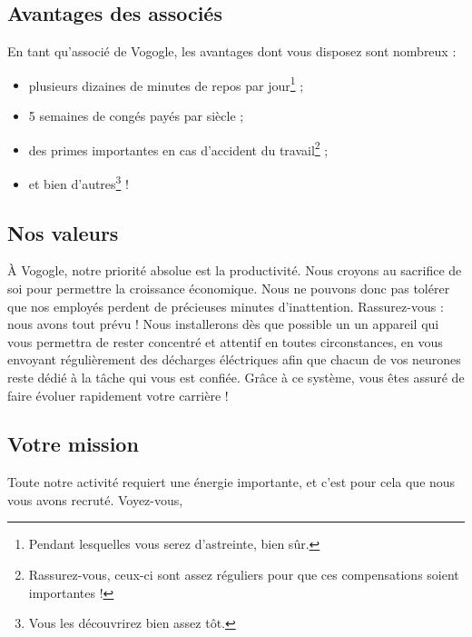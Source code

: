 \subsection{Avantages des associés}

En tant qu'associé de Vogogle, les avantages dont vous disposez sont nombreux :

\begin{itemize}
    \item plusieurs dizaines de minutes de repos par jour\footnote{Pendant
        lesquelles vous serez d'astreinte, bien sûr.} ;
    \item 5 semaines de congés payés par siècle ;
    \item des primes importantes en cas d'accident du
        travail\footnote{Rassurez-vous, ceux-ci sont assez réguliers pour
        que ces compensations soient importantes !} ;
    \item et bien d'autres\footnote{Vous les découvrirez bien assez tôt.} !
\end{itemize}

\subsection{Nos valeurs}

À Vogogle, notre priorité absolue est la productivité. Nous croyons au
sacrifice de soi pour permettre la croissance économique. Nous ne pouvons donc
pas tolérer que nos employés perdent de précieuses minutes d'inattention.
Rassurez-vous : nous avons tout prévu ! Nous installerons dès que possible un
un appareil qui vous permettra de rester concentré et attentif en toutes
circonstances, en vous envoyant régulièrement des décharges éléctriques afin
que chacun de vos neurones reste dédié à la tâche qui vous est confiée. Grâce à
ce système, vous êtes assuré de faire évoluer rapidement votre carrière !

\subsection{Votre mission}

Toute notre activité requiert une énergie importante, et c'est pour cela que
nous vous avons recruté. Voyez-vous, 

